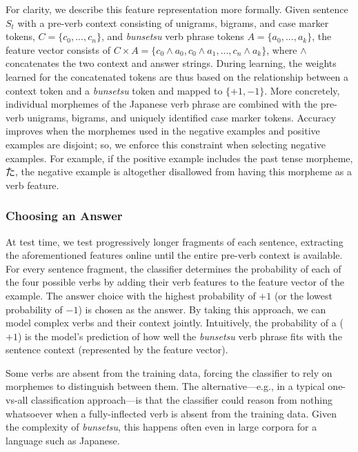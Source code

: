 For clarity, we describe this feature representation more
formally. Given sentence $S_t$ with a pre-verb context consisting of
unigrams, bigrams, and case marker tokens, $C=\{c_0, ..., c_n\}$, and
\textit{bunsetsu} verb phrase tokens $A=\{a_0, ..., a_k\}$, the
feature vector consists of
$C\times A = \{c_0\wedge a_0, c_0\wedge a_1, ..., c_n\wedge a_k\}$,
where $\wedge$ concatenates the two context and answer strings.
During learning, the weights learned for the concatenated tokens are
thus based on the relationship between a context token and a
\textit{bunsetsu} token and mapped to $\{+1,-1\}$.  More concretely,
individual morphemes of the Japanese verb phrase are combined with the
pre-verb unigrams, bigrams, and uniquely identified case marker
tokens.  Accuracy improves when the morphemes used in the negative
examples and positive examples are disjoint; so, we enforce this
constraint when selecting negative examples. For example, if the
positive example includes the past tense morpheme, た, the negative
example is altogether disallowed from having this morpheme as a verb
feature.  
\subsubsection{Choosing an Answer}
At test time, we test progressively longer fragments of each sentence,
extracting the aforementioned features online until the entire
pre-verb context is available. For every sentence fragment, the
classifier determines the probability of each of the four possible
verbs by adding their verb features to the feature vector of the
example.  The answer choice with the highest probability of $+1$ (or
the lowest probability of $-1$) is chosen as the answer. By taking
this approach, we can model complex verbs and their context jointly.
Intuitively, the probability of a ($+1$) is the model's prediction of
how well the \textit{bunsetsu} verb phrase fits with the sentence
context (represented by the feature vector).

Some verbs are absent from the training data, forcing the classifier
to rely on morphemes to distinguish between them.  The
alternative---e.g., in a typical one-vs-all classification
approach---is that the classifier could reason from nothing whatsoever
when a fully-inflected verb is absent from the training data. Given
the complexity of \textit{bunsetsu}, this happens often even in large
corpora for a language such as Japanese.






